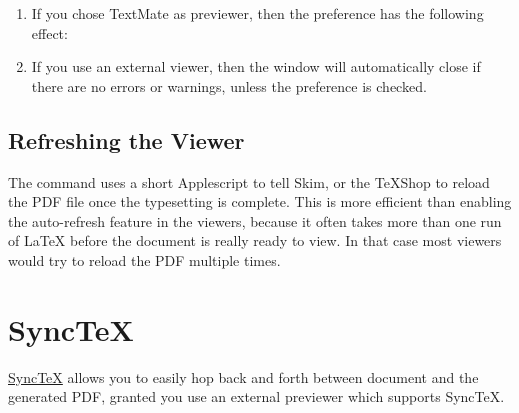 \documentclass[11pt, x11names]{article}
\begin{document}
\begin{enumerate}

    \item If you chose TextMate as previewer, then the  preference has the following effect:


    \item If you use an external viewer, then the  window will automatically close if there are no errors or warnings, unless the  preference is checked.

\end{enumerate}

\subsection{Refreshing the Viewer}

The  command uses a short Applescript to tell Skim, or the TeXShop to reload the PDF file once the typesetting is complete. This is more efficient than enabling the auto-refresh feature in the viewers, because it often takes more than one run of LaTeX before the document is really ready to view. In that case most viewers would try to reload the PDF multiple times.

\section{SyncTeX}

\href{http://mactex-wiki.tug.org/wiki/index.php/SyncTeX}{SyncTeX} allows you to easily hop back and forth between document and the generated PDF, granted you use an external previewer which supports SyncTeX.
\end{document}
